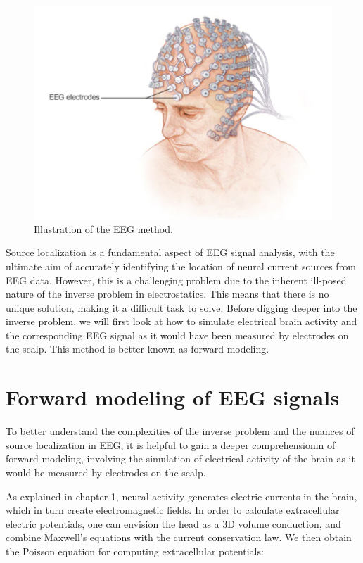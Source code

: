 \documentclass[a4paper, UKenglish, 11pt]{uiomaster}
\begin{document}
\begin{figure}[!htb]
    \centering
    \includegraphics[width=\linewidth]{figures/EEG_fig.png}
    \caption{Illustration of the EEG method.}
    \label{fig:EEG}
\end{figure}


Source localization is a fundamental aspect of EEG signal analysis, with the ultimate aim of accurately identifying the location of neural current sources from EEG data. However, this is a challenging problem due to the inherent ill-posed nature of the inverse problem in electrostatics. This means that there is no unique solution, making it a difficult task to solve. Before digging deeper into the inverse problem, we will first look at how to simulate electrical brain activity and the corresponding EEG signal as it would have been measured by electrodes on the scalp. This method is better known as forward modeling.

\section{Forward modeling of EEG signals}
To better understand the complexities of the inverse problem and the nuances of source localization in EEG, it is helpful to gain a deeper comprehensionin of forward modeling, involving the simulation of electrical activity of the brain as it would be measured by electrodes on the scalp.

As explained in chapter 1, neural activity generates electric currents in the brain, which in turn create electromagnetic fields. In order to calculate extracellular electric potentials, one can envision the head as a 3D volume conduction, and combine Maxwell's equations with the current conservation law. We then obtain the Poisson equation for computing extracellular potentials:
\end{document}
